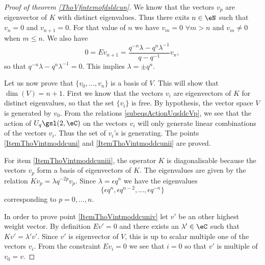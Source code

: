 \begin{proof}[Proof of theorem \ref{ThoVfintemofdsldcun}]
    We know that the vectors \( v_p\) are eigenvector of \( K\) with distinct eigenvalues. Thus there exits \( n\in\eN\) such that \( v_n=0\) and \( v_{n+1}=0\). For that value of \( n\) we have \( v_m=0\) \( \forall m>n\) and \( v_m\neq 0\) when \( m\leq n\). We also have
    \begin{equation}
        0=Ev_{n+1}=\frac{ q^{-n}\lambda-q^n\lambda^{-1} }{ q-q^{-1} }v_n,
    \end{equation}
    so that \( q^{-n}\lambda- q^n\lambda^{-1}=0\). This implies \( \lambda=\pm q^n\).
    
    Let us now prove that \( \{ v_0,\ldots,v_n \}\) is a basis of \( V\). This will show that \( \dim(V)=n+1\). First we know that the vectors \( v_i\) are eigenvectors of \( K\) for distinct eigenvalues, so that the set \( \{ v_i \}\) is free. By hypothesis, the vector space \( V\) is generated by \( v_0\). From the relations \eqref{subeqsActionUqsldcVp}, we see that the action of \( U_q\gsl(2,\eC)\) on the vectors \( v_i\) will only generate linear combinations of the vectors \( v_i\). Thus the set of \( v_i\)'s is generating. The points \ref{ItemThoVintmoddcuni} and \ref{ItemThoVintmoddcunii} are proved.

    For item \ref{ItemThoVintmoddcuniii}, the operator \( K\) is diagonalisable because the vectors \( v_p\) form a basis of eigenvectors of \( K\). The eigenvalues are given by the relation \( Kv_p=\lambda q^{-2p}v_p\). Since \( \lambda=\epsilon q^n\) we have the eigenvalues
    \begin{equation}
        \{ \epsilon q^n,\epsilon q^{n-2},\ldots,\epsilon q^{-n} \}
    \end{equation}
    corresponding to \( p=0,\ldots,n\).

    In order to prove point \ref{ItemThoVintmoddcuniv} let \( v'\) be an other highest weight vector. By definition \( Ev'=0\) and there exists an \( \lambda'\in\eC\) such that \( Kv'=\lambda'v'\). Since \( v'\) is eigenvector of \( V\), this is up to scalar multiple one of the vectors \( v_i\). From the constraint \( Ev_i=0\) we see that \( i=0\) so that \( v'\) is multiple of \( v_0=v\).

\end{proof}

